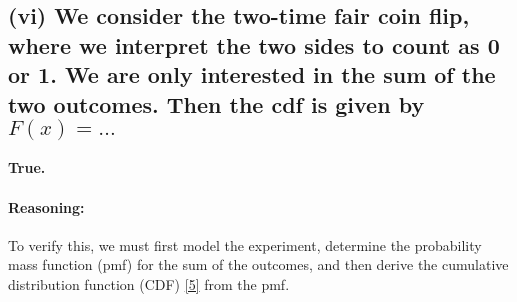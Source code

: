 \documentclass[11pt,a4paper]{article}
\begin{document}
\subsection*{(vi) We consider the two-time fair coin flip, where we interpret the two sides to count as 0 or 1. We are only interested in the sum of the two outcomes. Then the cdf is given by $F(x) = \dots$}

\textbf{True.}

\paragraph{Reasoning:}
To verify this, we must first model the experiment, determine the probability mass function (pmf) for the sum of the outcomes, and then derive the cumulative distribution function (CDF) \hyperlink{note5}{[5]} from the pmf.
\end{document}
